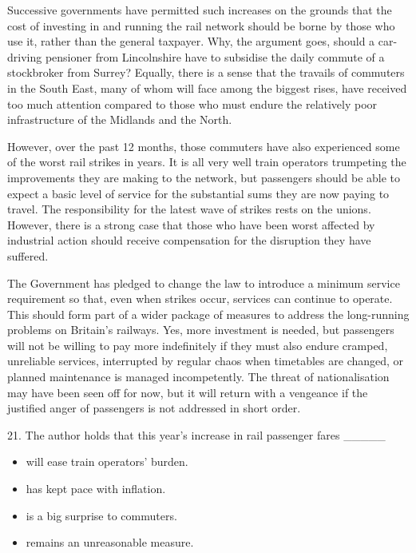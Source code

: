 \documentclass[UTF8,11pt]{ctexart}
\begin{document}
Successive governments have permitted such increases on the grounds that the cost of investing in and running the rail network should be borne by those who use it, rather than the general taxpayer. Why, the argument goes, should a car-driving pensioner from Lincolnshire have to subsidise the daily commute of a stockbroker from Surrey? Equally, there is a sense that the travails of commuters in the South East, many of whom will face among the biggest rises, have received too much attention compared to those who must endure the relatively poor infrastructure of the Midlands and the North.


However, over the past 12 months, those commuters have also experienced some of the worst rail strikes in years. It is all very well train operators trumpeting the improvements they are making to the network, but passengers should be able to expect a basic level of service for the substantial sums they are now paying to travel. The responsibility for the latest wave of strikes rests on the unions. However, there is a strong case that those who have been worst affected by industrial action should receive compensation for the disruption they have suffered.


The Government has pledged to change the law to introduce a minimum service requirement so that, even when strikes occur, services can continue to operate. This should form part of a wider package of measures to address the long-running problems on Britain’s railways. Yes, more investment is needed, but passengers will not be willing to pay more indefinitely if they must also endure cramped, unreliable services, interrupted by regular chaos when timetables are changed, or planned maintenance is managed incompetently. The threat of nationalisation may have been seen off for now, but it will return with a vengeance if the justified anger of passengers is not addressed in short order.


21. The author holds that this year’s increase in rail passenger fares \_\_\_\_\_


\begin{itemize}[leftmargin=2em,itemsep=.2em,topsep=.4em]\item[A.] will ease train operators’ burden.
\item[B.] has kept pace with inflation.
\item[C.] is a big surprise to commuters.
\item[D.] remains an unreasonable measure.
\end{itemize}
\end{document}
